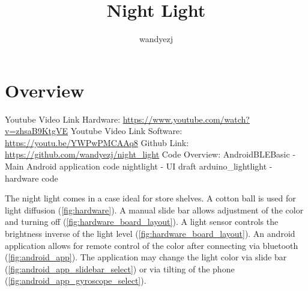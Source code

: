 \documentclass{article}
\title{Night Light}
\author{wandyezj}
\begin{document}
	\maketitle
	\tableofcontents
	
	
	
	\clearpage
	
	\section{Overview}
	
	Youtube Video Link Hardware: \href{https://www.youtube.com/watch?v=zhsaB9KtgVE}{https://www.youtube.com/watch?v=zhsaB9KtgVE}\newline
	Youtube Video Link Software: \href{https://youtu.be/YWPwPMCAAq8}{https://youtu.be/YWPwPMCAAq8}\newline
	Github Link: \href{https://github.com/wandyezj/night_light}{https://github.com/wandyezj/night\_light}\newline
	\newline
	Code Overview:
	\newline
	AndroidBLEBasic - Main Android application code
	\newline
	nightlight - UI draft
	\newline
	arduino\_lightlight - hardware code
	\newline
	\newline
	
	The night light comes in a case ideal for store shelves. A cotton ball is used for light diffusion (\ref{fig:hardware}).
	\newline
	A manual slide bar allows adjustment of the color and turning off (\ref{fig:hardware_board_layout}). 
	\newline
	A light sensor controls the brightness inverse of the light level (\ref{fig:hardware_board_layout}).
	\newline
	An android application allows for remote control of the color after connecting via bluetooth (\ref{fig:android_app}).
	\newline
	The application may change the light color via slide bar (\ref{fig:android_app_slidebar_select}) or via tilting of the phone (\ref{fig:android_app_gyroscope_select}).
	
	
\end{document}

